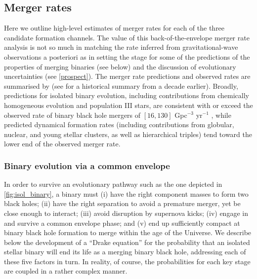 \documentclass[review]{elsarticle}
\begin{document}
\subsection{Merger rates}

Here we outline high-level estimates of merger rates for each of the three candidate formation channels. The value of this back-of-the-envelope merger rate analysis is not so much in matching the rate inferred from gravitational-wave observations a posteriori as in setting the stage for some of the predictions of the properties of merging binaries (see below) and the discussion of evolutionary uncertainties (see \autoref{prospect}).  The merger rate predictions and observed rates are summarised by \cite{MandelBroekgaarden:2021} (see \cite{ratesdoc} for a historical summary from a decade earlier).  Broadly, predictions for isolated binary evolution, including contributions from chemically homogeneous evolution and population III stars, are consistent with or exceed the observed rate of binary black hole mergers of $[16,130]$ Gpc$^{-3}$ yr$^{-1}$ \citep{GWTC3:pop}, while predicted dynamical formation rates (including contributions from globular, nuclear, and young stellar clusters, as well as hierarchical triples) tend toward the lower end of the observed merger rate.

\subsubsection{Binary evolution via a common envelope}\label{sec:CErates}

In order to survive an evolutionary pathway such as the one depicted in \autoref{fig:isol_binary}, a binary must (i) have the right component masses to form two black holes; (ii) have the right separation to avoid a premature merger, yet be close enough to interact; (iii) avoid disruption by supernova kicks; (iv) engage in and survive a common envelope phase; and (v) end up sufficiently compact at binary black hole formation to merge within the age of the Universe. We describe below the development of a ``Drake equation'' for the probability that an isolated stellar binary will end its life as a merging binary black hole, addressing each of these five factors in turn.   In reality, of course, the probabilities for each key stage are coupled in a rather complex manner.
\end{document}
